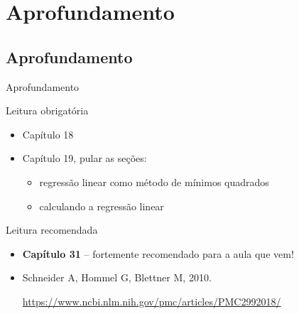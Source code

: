 \documentclass{beamer}
\begin{document}
\section{Aprofundamento}

\subsection{Aprofundamento}

\begin{frame}{Aprofundamento}
  \begin{block}{Leitura obrigatória}
    \begin{itemize}
      \footnotesize
    \item Capítulo 18
    \item Capítulo 19, pular as seções:
      \begin{itemize}
        \scriptsize
      \item regressão linear como método de mínimos quadrados
      \item calculando a regressão linear
      \end{itemize}
    \end{itemize}
  \end{block}
  \begin{block}{Leitura recomendada}
    \small
    
    \begin{itemize}
    \item {\bf Capítulo 31} -- {\footnotesize fortemente recomendado para a aula que vem!}
      \scriptsize
    \item Schneider A, Hommel G, Blettner M, 2010.

      \url{https://www.ncbi.nlm.nih.gov/pmc/articles/PMC2992018/}

    \end{itemize}
  \end{block}
\end{frame}
\end{document}
